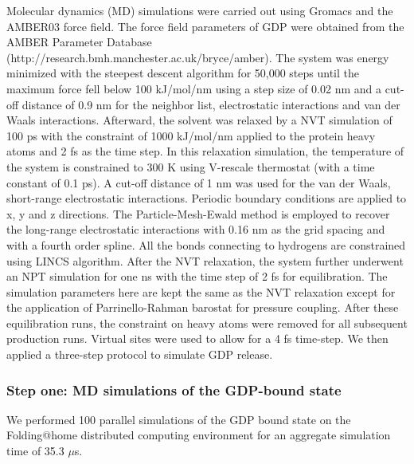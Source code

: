 \documentclass[../main.tex]{subfiles}
\begin{document}
            Molecular dynamics (MD) simulations were carried out using Gromacs\cite{Abraham:2015gj,VanDerSpoel:2005hz} and the AMBER03 force field\cite{Duan:2003gt}. The force field parameters of GDP were obtained from the AMBER Parameter Database (http://research.bmh.manchester.ac.uk/bryce/amber)\cite{Meagher:2003be}. The system was energy minimized with the steepest descent algorithm for 50,000 steps until the maximum force fell below 100 kJ/mol/nm using a step size of 0.02 nm and a cut-off distance of 0.9 nm for the neighbor list, electrostatic interactions and van der Waals interactions. Afterward, the solvent was relaxed by a NVT simulation of 100 ps with the constraint of 1000 kJ/mol/nm applied to the protein heavy atoms and 2 fs as the time step. In this relaxation simulation, the temperature of the system is constrained to 300 K using V-rescale thermostat (with a time constant of 0.1 ps)\cite{Bussi:2007cs}. A cut-off distance of 1 nm was used for the van der Waals, short-range electrostatic interactions. Periodic boundary conditions are applied to x, y and z directions. The Particle-Mesh-Ewald method is employed to recover the long-range electrostatic interactions with 0.16 nm as the grid spacing and with a fourth order spline\cite{Kolafa:2006jh}. All the bonds connecting to hydrogens are constrained using LINCS algorithm\cite{Hess:2008fl}. After the NVT relaxation, the system further underwent an NPT simulation for one ns with the time step of 2 fs for equilibration. The simulation parameters here are kept the same as the NVT relaxation except for the application of Parrinello-Rahman barostat for pressure coupling\cite{Parrinello:1981it}. After these equilibration runs, the constraint on heavy atoms were removed for all subsequent production runs. Virtual sites were used to allow for a 4 fs time-step\cite{Feenstra:1999ue}. We then applied a three-step protocol to simulate GDP release.
        \subsubsection{Step one: MD simulations of the GDP-bound state}
            We performed 100 parallel simulations of the GDP bound state on the Folding@home\cite{Shirts:2000du} distributed computing environment for an aggregate simulation time of 35.3 $\mu$s.
\end{document}
